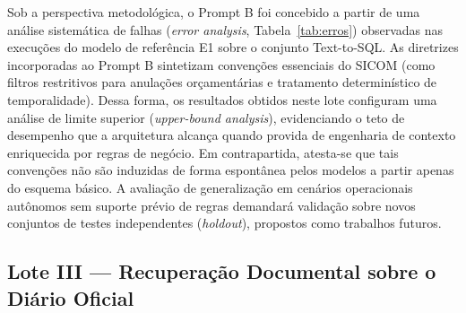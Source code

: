 \documentclass[12pt]{article}
\begin{document}
Sob a perspectiva metodológica, o Prompt B foi concebido a partir de uma análise sistemática de falhas (\textit{error analysis}, Tabela~\ref{tab:erros}) observadas nas execuções do modelo de referência E1 sobre o conjunto Text-to-SQL. As diretrizes incorporadas ao Prompt B sintetizam convenções essenciais do SICOM (como filtros restritivos para anulações orçamentárias e tratamento determinístico de temporalidade). Dessa forma, os resultados obtidos neste lote configuram uma análise de limite superior (\textit{upper-bound analysis}), evidenciando o teto de desempenho que a arquitetura alcança quando provida de engenharia de contexto enriquecida por regras de negócio. Em contrapartida, atesta-se que tais convenções não são induzidas de forma espontânea pelos modelos a partir apenas do esquema básico. A avaliação de generalização em cenários operacionais autônomos sem suporte prévio de regras demandará validação sobre novos conjuntos de testes independentes (\textit{holdout}), propostos como trabalhos futuros.

\begin{table}[htbp]
\centering
\caption{Taxonomia de falhas do baseline E1 sanadas pelo Prompt B}
\label{tab:erros}
\end{table}

\subsection{Lote III --- Recuperação Documental sobre o Diário Oficial}
\end{document}
